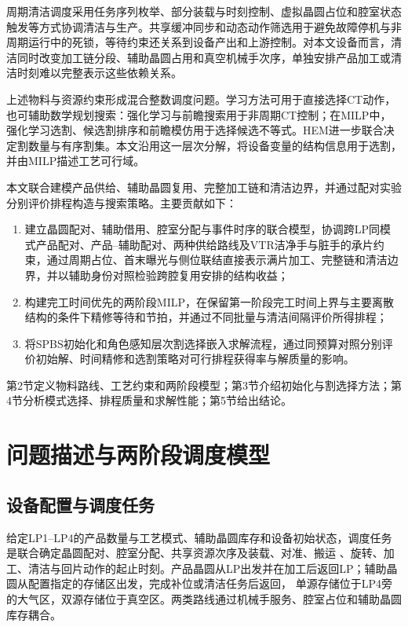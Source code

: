 \documentclass[final,5p,times,twocolumn]{elsarticle}
\begin{document}
周期清洁调度采用任务序列枚举、部分装载与时刻控制、虚拟晶圆占位和腔室状态触发等方式协调清洁与生产\citep{kim2013cleaning,yu2020delay,qiao2022binary,li2022conditioncleaning}。共享缓冲同步和动态动作筛选用于避免故障停机与非周期运行中的死锁\citep{zhu2025failuredeadlock,kim2025noncyclicdeadlock}，等待约束还关系到设备产出和上游控制\citep{lee2018waiting}。对本文设备而言，清洁同时改变加工链分段、辅助晶圆占用和真空机械手次序，单独安排产品加工或清洁时刻难以完整表示这些依赖关系。

上述物料与资源约束形成混合整数调度问题。学习方法可用于直接选择CT动作，也可辅助数学规划搜索：强化学习与前瞻搜索用于非周期CT控制\citep{kim2025adaptivecluster}；在MILP中，强化学习选割、候选割排序和前瞻模仿用于选择候选不等式\citep{tang2020cut,huang2022cutranking,paulus2022looking}。HEM进一步联合决定割数量与有序割集\citep{wang2023hem}。本文沿用这一层次分解，将设备变量的结构信息用于选割，并由MILP描述工艺可行域。

本文联合建模产品供给、辅助晶圆复用、完整加工链和清洁边界，并通过配对实验分别评价排程构造与搜索策略。主要贡献如下：
\begin{enumerate}[leftmargin=*]
\item 建立晶圆配对、辅助借用、腔室分配与事件时序的联合模型，协调跨LP同模式产品配对、产品--辅助配对、两种供给路线及VTR洁净手与脏手的承片约束，通过周期占位、首末曝光与侧位联结直接表示满片加工、完整链和清洁边界，并以辅助身份对照检验跨腔复用安排的结构收益；
\item 构建完工时间优先的两阶段MILP，在保留第一阶段完工时间上界与主要离散结构的条件下精修等待和节拍，并通过不同批量与清洁间隔评价所得排程；
\item 将SPBS初始化和角色感知层次割选择嵌入求解流程，通过同预算对照分别评价初始解、时间精修和选割策略对可行排程获得率与解质量的影响。
\end{enumerate}

第2节定义物料路线、工艺约束和两阶段模型；第3节介绍初始化与割选择方法；第4节分析模式选择、排程质量和求解性能；第5节给出结论。

\section{问题描述与两阶段调度模型}
\setcounter{equation}{0}

\subsection{设备配置与调度任务}

给定LP1--LP4的产品数量与工艺模式、辅助晶圆库存和设备初始状态，调度任务是联合确定晶圆配对、腔室分配、共享资源次序及装载、对准、搬运
、旋转、加工、清洁与回片动作的起止时刻。产品晶圆从LP出发并在加工后返回LP；辅助晶圆从配置指定的存储区出发，完成补位或清洁任务后返回，
单源存储位于LP4旁的大气区，双源存储位于真空区。两类路线通过机械手服务、腔室占位和辅助晶圆库存耦合。
\end{document}
